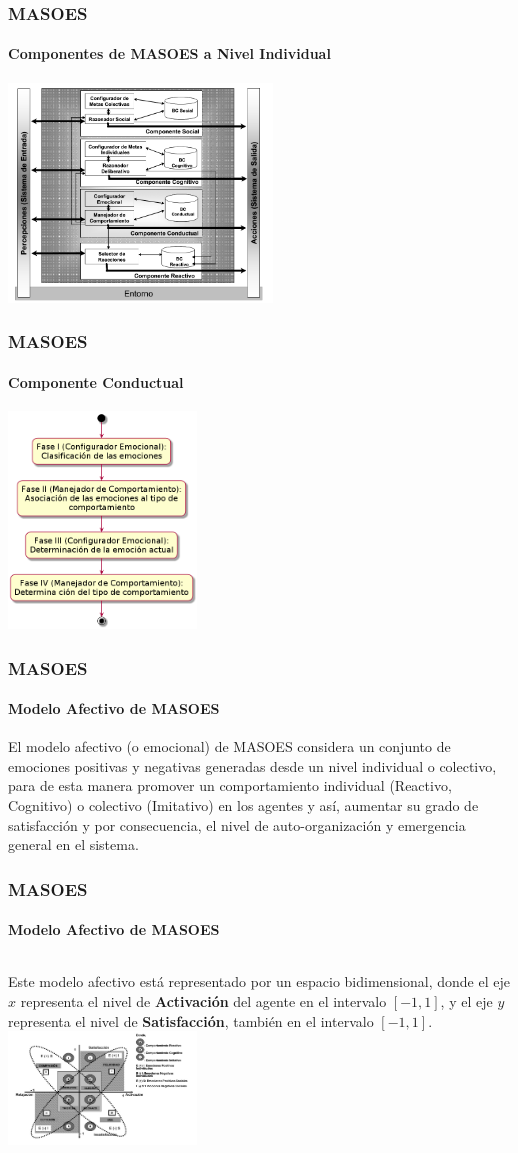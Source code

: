 \documentclass{beamer}
\begin{document}
\begin{frame}
\frametitle{MASOES}
\framesubtitle{Componentes de MASOES a Nivel Individual}
\centering
\includegraphics[width=7cm]{ilustraciones/componentes-masoes-individual}
\end{frame}

\begin{frame}
\frametitle{MASOES}
\framesubtitle{Componente Conductual}
\centering
\includegraphics[width=5cm]{ilustraciones/componente-conductual}
\end{frame}

\begin{frame}
\frametitle{MASOES}
\framesubtitle{Modelo Afectivo de MASOES}
El modelo afectivo (o emocional) de MASOES considera un conjunto de
emociones positivas y negativas generadas desde un nivel individual o colectivo,
para de esta manera promover un comportamiento individual (Reactivo, Cognitivo)
o colectivo (Imitativo) en los agentes y así, aumentar su grado de satisfacción
y por consecuencia, el nivel de auto-organización y emergencia general en el
sistema.
\end{frame}

\begin{frame}
\frametitle{MASOES}
\framesubtitle{Modelo Afectivo de MASOES}
\begin{columns}
Este modelo afectivo está representado por un espacio bidimensional,
donde el eje $x$ representa el nivel de \textbf{Activación} del agente en el
intervalo $[-1, 1]$, y el eje $y$ representa el nivel de \textbf{Satisfacción},
también en el intervalo $[-1, 1]$.
\includegraphics[width=5cm]{ilustraciones/modelo-afectivo}
\end{columns}
\end{frame}
\end{document}
